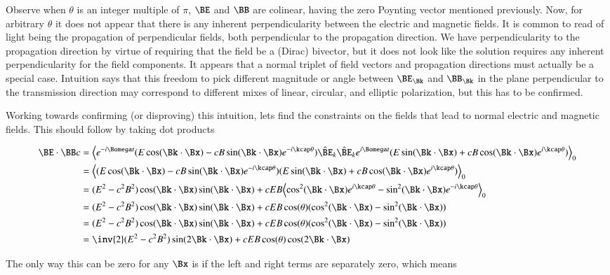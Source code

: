 Observe when $\theta$ is an integer multiple of $\pi$, $\BE$ and $\BB$ are colinear, having the zero Poynting vector mentioned previously.
Now, for arbitrary $\theta$ it does not appear that there is any inherent perpendicularity between the electric and magnetic fields.  It is common
to read of light being the propagation of perpendicular fields, both perpendicular to the propagation direction.  We have perpendicularity to the
propagation direction by virtue of requiring that the field be a (Dirac) bivector, but it does not look like the solution requires any inherent perpendicularity for the field components.  It appears that a normal triplet of field vectors and propagation directions must actually be a special case.
Intuition says that this freedom to pick different magnitude or angle between $\BE_\Bk$ and $\BB_\Bk$ in the plane perpendicular to the transmission direction may correspond to different mixes of linear, circular, and elliptic polarization, but this has to be confirmed.

Working towards confirming (or disproving) this intuition, lets find the constraints on the fields that lead to normal electric and magnetic fields.  This should follow by taking dot products

\begin{align*}
\BE \cdot \BB c
&=
\gpgradezero{
e^{-i\Bomega t} (E \cos(\Bk \cdot \Bx) - c B \sin(\Bk \cdot \Bx) e^{-i \kcap\theta}) \hat{\BE}_k
\hat{\BE}_k
e^{i\Bomega t} (E \sin(\Bk \cdot \Bx) + c B \cos(\Bk \cdot \Bx) e^{i \kcap\theta})
} \\
&=
\gpgradezero{
(E \cos(\Bk \cdot \Bx) - c B \sin(\Bk \cdot \Bx) e^{-i \kcap\theta})
(E \sin(\Bk \cdot \Bx) + c B \cos(\Bk \cdot \Bx) e^{i \kcap\theta})
} \\
&=
(E^2 - c^2 B^2) \cos(\Bk \cdot \Bx) \sin(\Bk \cdot \Bx)
+ c E B
\gpgradezero{
\cos^2(\Bk \cdot \Bx) e^{i \kcap \theta}
-\sin^2(\Bk \cdot \Bx) e^{-i \kcap \theta}
} \\
&=
(E^2 - c^2 B^2) \cos(\Bk \cdot \Bx) \sin(\Bk \cdot \Bx)
+ c E B \cos(\theta) ( \cos^2(\Bk \cdot \Bx) -\sin^2(\Bk \cdot \Bx) ) \\
&=
(E^2 - c^2 B^2) \cos(\Bk \cdot \Bx) \sin(\Bk \cdot \Bx)
+ c E B \cos(\theta) ( \cos^2(\Bk \cdot \Bx) -\sin^2(\Bk \cdot \Bx) ) \\
&=
\inv{2} (E^2 - c^2 B^2) \sin(2 \Bk \cdot \Bx)
+ c E B \cos(\theta) \cos(2 \Bk \cdot \Bx) \\
\end{align*}

The only way this can be zero for any $\Bx$ is if the left and right terms are separately zero, which means

